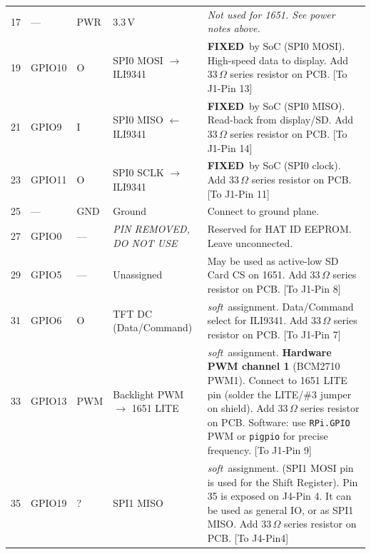 \documentclass[11pt,a4paper]{article}
\newcommand{\fixed}{\textbf{FIXED}}
\newcommand{\soft}{\textit{soft}}
\newcommand{\na}{---}
\begin{document}
\begin{longtable}{C{0.9cm} C{1.3cm} C{0.8cm} L{3.5cm} L{7.5cm}}
  17 & \na & PWR & 3.3\,V &
    \textit{Not used for 1651. See power notes above.} \\

  19 & GPIO10 & O & SPI0 MOSI $\to$ ILI9341 &
    \fixed\ by SoC (SPI0 MOSI). High-speed data to display.
    Add 33\,$\Omega$ series resistor on PCB.
    [To J1-Pin 13] \\

  21 & GPIO9 & I & SPI0 MISO $\leftarrow$ ILI9341 &
    \fixed\ by SoC (SPI0 MISO). Read-back from display/SD.
    Add 33\,$\Omega$ series resistor on PCB. 
    [To J1-Pin 14]\\

  23 & GPIO11 & O & SPI0 SCLK $\to$ ILI9341 &
    \fixed\ by SoC (SPI0 clock).
    Add 33\,$\Omega$ series resistor on PCB. 
    [To J1-Pin 11]\\

  25 & \na & GND & Ground &
    Connect to ground plane. \\

  27 & GPIO0 & \na & \textit{PIN REMOVED, DO NOT USE} &
    Reserved for HAT ID EEPROM. Leave unconnected. \\

  29 & GPIO5 & \na & Unassigned &
  May be used as active-low SD Card CS on 1651.
  Add 33\,$\Omega$ series resistor on PCB. 
  [To J1-Pin 8]\\

  31 & GPIO6 & O & TFT DC (Data/Command) &
  \soft\ assignment. Data/Command select for ILI9341.
  Add 33\,$\Omega$ series resistor on PCB. 
  [To J1-Pin 7]\\

  33 & GPIO13 & PWM & Backlight PWM $\to$ 1651 LITE &
    \soft\ assignment. \textbf{Hardware PWM channel 1} (BCM2710 PWM1).
    Connect to 1651 LITE pin (solder the LITE/\#3 jumper on shield).
    Add 33\,$\Omega$ series resistor on PCB.
    Software: use \texttt{RPi.GPIO} PWM or \texttt{pigpio} for precise frequency.  
    [To J1-Pin 9] \\

  35 & GPIO19 & ? & SPI1 MISO &
    \soft\ assignment. (SPI1 MOSI pin is used for the Shift Register).
    Pin 35 is exposed on J4-Pin 4. It can be used as general IO, or as SPI1 MISO.
    Add 33\,$\Omega$ series resistor on PCB. [To J4-Pin4] \\


\end{longtable}
\end{document}
